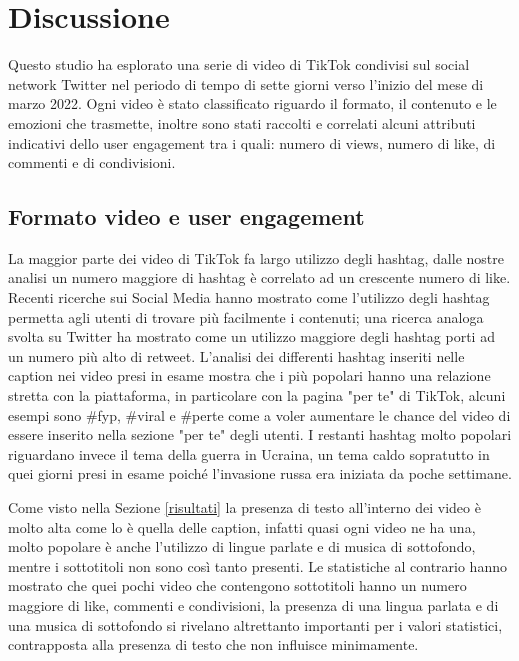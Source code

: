 \section{Discussione}

Questo studio ha esplorato una serie di video di TikTok condivisi sul social network Twitter nel periodo di tempo di sette giorni 
verso l'inizio del mese di marzo 2022. 
Ogni video è stato classificato riguardo il formato, il contenuto e le emozioni che trasmette, inoltre 
sono stati raccolti e correlati alcuni attributi indicativi dello user engagement tra i quali: numero di views, 
numero di like, di commenti e di condivisioni.

\subsection{Formato video e user engagement}

La maggior parte dei video di TikTok fa largo utilizzo degli hashtag, dalle nostre analisi un numero maggiore di hashtag è 
correlato ad un crescente numero di like.
Recenti ricerche sui Social Media hanno mostrato come l'utilizzo degli hashtag permetta agli utenti di trovare più facilmente i 
contenuti\cite{chang2010new}; una ricerca analoga svolta su Twitter ha mostrato come un utilizzo maggiore degli hashtag porti 
ad un numero più alto di retweet\cite{saxton2015advocatingforchange}.
L'analisi dei differenti hashtag inseriti nelle caption nei video presi in esame mostra che i più popolari hanno una relazione stretta 
con la piattaforma, in particolare con la pagina "per te" di TikTok, alcuni esempi sono \#fyp, \#viral e \#perte come a voler aumentare 
le chance del video di essere inserito nella sezione "per te" degli utenti. 
I restanti hashtag molto popolari riguardano invece il tema della guerra in Ucraina, un tema caldo sopratutto in quei giorni presi in 
esame poiché l'invasione russa era iniziata da poche settimane.

Come visto nella Sezione \ref{risultati} la presenza di testo all'interno dei video è molto alta come lo è quella delle caption, infatti 
quasi ogni video ne ha una, molto popolare è anche l'utilizzo di lingue parlate e di musica di sottofondo, mentre i sottotitoli non 
sono così tanto presenti. Le statistiche al contrario hanno mostrato che quei pochi video che contengono sottotitoli hanno un numero 
maggiore di like, commenti e condivisioni, la presenza di una lingua parlata e di una musica di sottofondo si rivelano altrettanto 
importanti per i valori statistici, contrapposta alla presenza di testo che non influisce minimamente.

